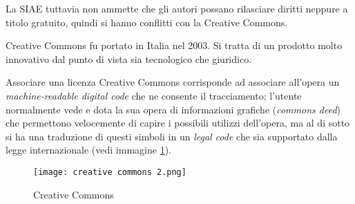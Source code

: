La SIAE tuttavia non ammette che gli autori possano rilasciare diritti neppure a titolo gratuito, quindi si hanno conflitti con la Creative Commons. 

Creative Commons fu portato in Italia nel 2003. Si tratta di un prodotto molto innovativo dal punto di vista sia tecnologico che giuridico.


Associare una licenza Creative Commons corrisponde ad associare all'opera un \textit{machine-readable digital code} che ne consente il tracciamento; l'utente normalmente vede e dota la sua opera di informazioni grafiche (\textit{commons deed}) che permettono velocemente di capire i possibili utilizzi dell'opera, ma al di sotto si ha una traduzione di questi simboli in un \textit{legal code} che sia supportato dalla legge internazionale (vedi immagine \ref{creativeCommons2}).

\begin{figure}
    \centering
    \texttt{[image: creative commons 2.png]}
    \caption{Creative Commons}
    \label{creativeCommons2}
\end{figure}